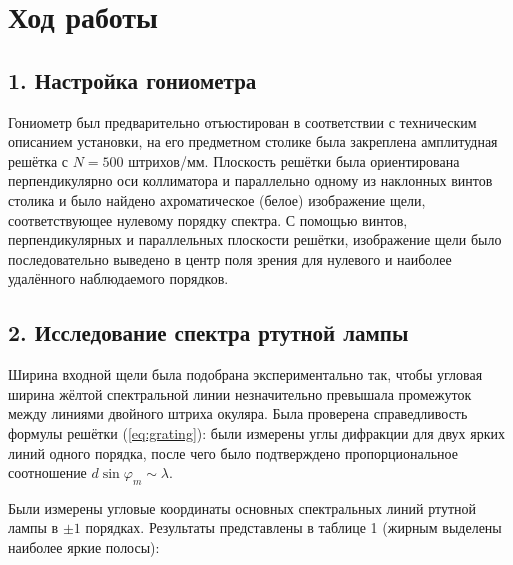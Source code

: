 \documentclass[12pt,a4paper]{article}
\begin{document}
\section*{Ход работы}

\subsection*{1. Настройка гониометра}
Гониометр был предварительно отъюстирован в соответствии с техническим описанием установки, на его предметном столике была закреплена амплитудная решётка с $N = 500$ штрихов/мм. Плоскость решётки была ориентирована перпендикулярно оси коллиматора и параллельно одному из наклонных винтов столика и было найдено ахроматическое (белое) изображение щели, соответствующее нулевому порядку спектра. С помощью винтов, перпендикулярных и параллельных плоскости решётки, изображение щели было последовательно выведено в центр поля зрения для нулевого и наиболее удалённого наблюдаемого порядков. %

\subsection*{2. Исследование спектра ртутной лампы}
Ширина входной щели была подобрана экспериментально так, чтобы угловая ширина жёлтой спектральной линии незначительно превышала промежуток между линиями двойного штриха окуляра. Была проверена справедливость формулы решётки (\ref{eq:grating}): были измерены углы дифракции для двух ярких линий одного порядка, после чего было подтверждено пропорциональное соотношение $d \sin \varphi_m \sim \lambda$.

Были измерены угловые координаты основных спектральных линий ртутной лампы в $\pm 1$ порядках. Результаты представлены в таблице 1 (жирным выделены наиболее яркие полосы):
\end{document}
